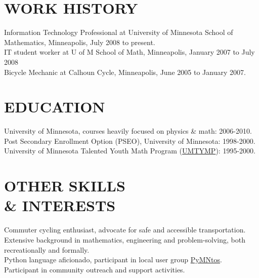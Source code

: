\documentclass[line,margin]{res}
\begin{document}
\begin{resume}
\section{WORK HISTORY}
    Information Technology Professional at University of Minnesota School
    of Mathematics, Minneapolis, July 2008 to present.
    \vspace{1 mm} \\
    IT student worker at U of M School of Math, Minneapolis, January 2007
    to July 2008
    \vspace{1 mm} \\
    Bicycle Mechanic at Calhoun Cycle, Minneapolis, June 2005 to January
    2007.

\section{EDUCATION}
    University of Minnesota, courses heavily focused on physics \& math: 2006-2010.
    \vspace{1 mm} \\
    Post Secondary Enrollment Option (PSEO), University of Minnesota:
    1998-2000.
    \vspace{1 mm} \\
    University of Minnesota Talented Youth Math Program
    (\href{http://mathcep.umn.edu/umtymp/}{UMTYMP}):
    1995-2000.

\section{OTHER SKILLS \\ \& INTERESTS}
    Commuter cycling enthusiast, advocate for safe and accessible
    transportation.
    \vspace{1 mm} \\
    Extensive background in mathematics, engineering and problem-solving,
    both recreationally and formally.
    \vspace{1 mm} \\
    Python language aficionado, participant in local user group
    \href{http://www.python.mn/}{PyMNtos}. 
    \vspace{1 mm} \\
    Participant in community outreach and support activities.

\end{resume}
\end{document}
